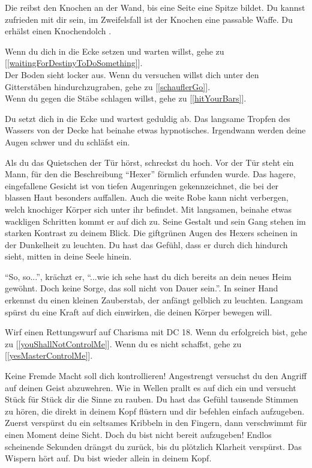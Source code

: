 
Die reibst den Knochen an der Wand, bis eine Seite eine Spitze bildet. Du kannst zufrieden mit dir sein, im Zweifelsfall ist der Knochen eine passable Waffe.
Du erhälst einen Knochendolch .

Wenn du dich in die Ecke setzen und warten willst, gehe zu [\ref{waitingForDestinyToDoSomething}].
\\Der Boden sieht locker aus. Wenn du versuchen willst dich unter den Gitterstäben hindurchzugraben, gehe zu [\ref{schauflerGo}].
\\Wenn du gegen die Stäbe schlagen willst, gehe zu [\ref{hitYourBars}].


Du setzt dich in die Ecke und wartest geduldig ab. Das langsame Tropfen des Wassers von der Decke hat beinahe etwas hypnotisches. Irgendwann werden deine Augen schwer und du schläfst ein.

Als du das Quietschen der Tür hörst, schreckst du hoch. Vor der Tür steht ein Mann, für den die Beschreibung ``Hexer'' förmlich erfunden wurde. Das hagere, eingefallene Gesicht ist von tiefen Augenringen gekennzeichnet, die bei der blassen Haut besonders auffallen. Auch die weite Robe kann nicht verbergen, welch knochiger Körper sich unter ihr befindet. Mit langsamen, beinahe etwas wackligen Schritten kommt er auf dich zu. Seine Gestalt und sein Gang stehen im starken Kontrast zu deinem Blick. Die giftgrünen Augen des Hexers scheinen in der Dunkelheit zu leuchten. Du hast das Gefühl, dass er durch dich hindurch sieht, mitten in deine Seele hinein.

``So, so...'', krächzt er, ``...wie ich sehe hast du dich bereits an dein neues Heim gewöhnt. Doch keine Sorge, das soll nicht von Dauer sein.''. In seiner Hand erkennst du einen kleinen Zauberstab, der anfängt gelblich zu leuchten. Langsam spürst du eine Kraft auf dich einwirken, die deinen Körper bewegen will.

Wirf einen Rettungswurf auf Charisma mit DC 18. Wenn du erfolgreich bist, gehe zu [\ref{youShallNotControlMe}]. Wenn du es nicht schaffst, gehe zu [\ref{yesMasterControlMe}].


Keine Fremde Macht soll dich kontrollieren! Angestrengt versuchst du den Angriff auf deinen Geist abzuwehren. Wie in Wellen prallt es auf dich ein und versucht Stück für Stück dir die Sinne zu rauben. Du hast das Gefühl tausende Stimmen zu hören, die direkt in deinem Kopf flüstern und dir befehlen einfach aufzugeben. Zuerst verspürst du ein seltsames Kribbeln in den Fingern, dann verschwimmt für einen Moment deine Sicht. Doch du bist nicht bereit aufzugeben! Endlos scheinende Sekunden drängst du zurück, bis du plötzlich Klarheit verspürst. Das Wispern hört auf. Du bist wieder allein in deinem Kopf.


